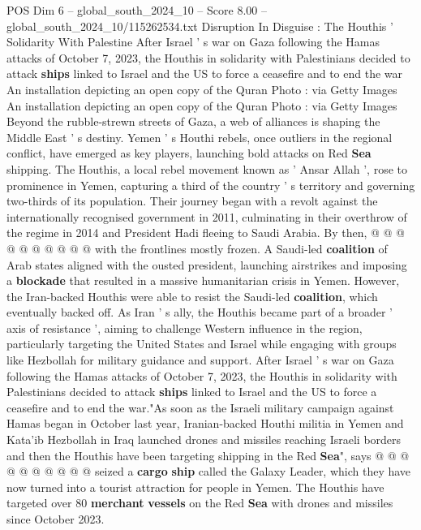 \begin{textsample}{POS Dim 6 – global\_south\_2024\_10 – Score 8.00 – global\_south\_2024\_10/115262534.txt}  \label{ex:f6_pos_401}
Disruption In Disguise : The Houthis ' Solidarity With Palestine After Israel ' s war on Gaza following the Hamas attacks of October 7, 2023, the Houthis in solidarity with Palestinians decided to attack \textbf{ships} linked to Israel and the US to force a ceasefire and to end the war An installation depicting an open copy of the Quran Photo : via Getty Images An installation depicting an open copy of the Quran Photo : via Getty Images Beyond the rubble-strewn streets of Gaza, a web of alliances is shaping the Middle East ' s destiny.
Yemen ' s Houthi rebels, once outliers in the regional conflict, have emerged as key players, launching bold attacks on Red \textbf{Sea} shipping.
The Houthis, a local rebel movement known as ' Ansar Allah ', rose to prominence in Yemen, capturing a third of the country ' s territory and governing two-thirds of its population.
Their journey began with a revolt against the internationally recognised government in 2011, culminating in their overthrow of the regime in 2014 and President Hadi fleeing to Saudi Arabia.
By then, @ @ @ @ @ @ @ @ @ @ with the frontlines mostly frozen.
A Saudi-led \textbf{coalition} of Arab states aligned with the ousted president, launching airstrikes and imposing a \textbf{blockade} that resulted in a massive humanitarian crisis in Yemen.
However, the Iran-backed Houthis were able to resist the Saudi-led \textbf{coalition}, which eventually backed off.
As Iran ' s ally, the Houthis became part of a broader ' axis of resistance ', aiming to challenge Western influence in the region, particularly targeting the United States and Israel while engaging with groups like Hezbollah for military guidance and support.
After Israel ' s war on Gaza following the Hamas attacks of October 7, 2023, the Houthis in solidarity with Palestinians decided to attack \textbf{ships} linked to Israel and the US to force a ceasefire and to end the war."As soon as the Israeli military campaign against Hamas began in October last year, Iranian-backed Houthi militia in Yemen and Kata'ib Hezbollah in Iraq launched drones and missiles reaching Israeli borders and then the Houthis have been targeting shipping in the Red \textbf{Sea}", says @ @ @ @ @ @ @ @ @ @ seized a \textbf{cargo} \textbf{ship} called the Galaxy Leader, which they have now turned into a tourist attraction for people in Yemen.
The Houthis have targeted over 80 \textbf{merchant} \textbf{vessels} on the Red \textbf{Sea} with drones and missiles since October 2023.

\end{textsample}
